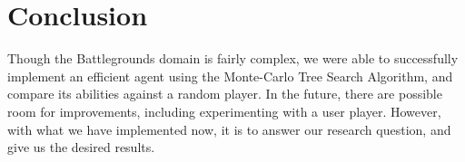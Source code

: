 \documentclass{paper}
\begin{document}
\section{Conclusion}
Though the Battlegrounds domain is fairly complex, we were able to successfully implement an efficient agent using the Monte-Carlo Tree Search Algorithm, and compare its abilities against a random player. In the future, there are possible room for improvements, including experimenting with a user player. However, with what we have implemented now, it is to answer our research question, and give us the desired results.

\FloatBarrier
\clearpage
\printbibliography[]
\end{document}
